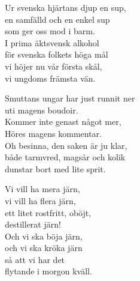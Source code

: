 \documentclass[a6paper, 10pt, twoside]{article}
\begin{document}
\noindent
\begin{center}
\end{center}
\begin{lyrics}
Ur svenska hjärtans djup en sup, \\
en samfälld och en enkel sup \\
som ger oss mod i barm. \\
I prima äktsvensk alkohol \\
för svenska folkets höga mål \\
vi höjer nu vår första skål, \\
vi ungdoms främsta vän.
\end{lyrics}
\begin{center}
\end{center}
\begin{lyrics}
Smuttans ungar har just runnit ner \\
uti magens boudoir. \\
Kommer inte genast något mer, \\
Höres magens kommentar. \\
Oh besinna, den saken är ju klar, \\
både tarmvred, magsår och kolik \\
dunstar bort med lite sprit. 
\end{lyrics}
\begin{center}
\end{center}
\begin{lyrics}
Vi vill ha mera järn, \\
vi vill ha flera järn, \\
ett litet rostfritt, oböjt, \\
destillerat järn! \\
Och vi ska böja järn, \\
och vi ska kröka järn \\
så att vi har det \\
flytande i morgon kväll.
\end{lyrics}
\end{document}
